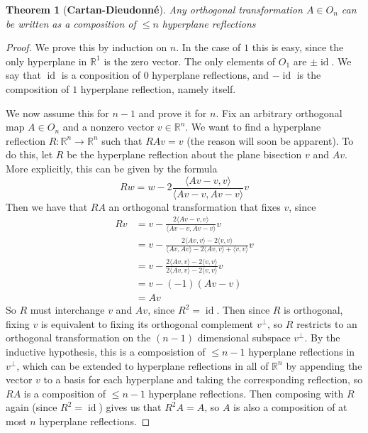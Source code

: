 \documentclass{article}
\newcommand{\R}{\mathbb{R}}
\newtheorem{theorem}{Theorem}[section]
\DeclareMathOperator{\id}{id}
\begin{document}
\begin{theorem}[\textbf{Cartan-Dieudonn\'e}]
Any orthogonal transformation $A \in O_n$ can be written as a composition of $\leq n$ hyperplane reflections
\end{theorem}
\begin{proof}
We prove this by induction on $n$. In the case of $1$ this is easy, since the only hyperplane in $\R^1$ is the zero vector. The only elements of $O_1$ are $\pm \id$. We say that $\id$ is a conposition of $0$ hyperplane reflections, and $-\id$ is the composition of $1$ hyperplane reflection, namely itself.

We now assume this for $n-1$ and prove it for $n$. Fix an arbitrary orthogonal map $A \in O_n$ and a nonzero vector $v \in \R^n$. We want to find a hyperplane reflection $R : \R^n \to \R^n$ such that $RAv = v$ (the reason will soon be apparent). To do this, let $R$ be the hyperplane reflection about the plane bisection $v$ and $Av$. More explicitly, this can be given by the formula
$$Rw = w - 2\frac{\langle Av - v, v \rangle}{\langle Av -v, Av - v\rangle}v$$
Then we have that $RA$ an orthogonal transformation that fixes $v$, since 
\begin{align*}
Rv &= v - \frac{2 \langle Av - v, v \rangle}{\langle Av -v, Av -v \rangle} v \\
&= v - \frac{2\langle Av, v \rangle - 2\langle v, v \rangle}{\langle Av, Av \rangle - 2\langle Av, v \rangle + \langle v,v \rangle}v \\
&= v - \frac{2\langle Av,v \rangle - 2 \langle v,v \rangle}{2 \langle Av,v \rangle - 2 \langle v,v \rangle}v \\
&= v - (-1)(Av -v) \\
&= Av
\end{align*}
So $R$ must  interchange $v$ and $Av$, since $R^2 = \id$. Then since $R$ is orthogonal, fixing $v$ is equivalent to fixing its orthogonal complement $v^\perp$, so $R$ restricts to an orthogonal transformation on the $(n-1)$ dimensional subspace $v^\perp$. By the inductive hypothesis, this is a composistion of $\leq n-1$ hyperplane reflections in $v^\perp$, which can be extended to hyperplane reflections in all of $\R^n$ by appending the vector $v$ to a basis for each hyperplane and taking the corresponding reflection, so $RA$ is a composition of $\leq n-1$ hyperplane reflections. Then composing with $R$ again (since $R^2 = \id$) gives us that $R^2A = A$, so $A$ is also a composition of at most $n$ hyperplane reflections.
\end{proof}
\end{document}
